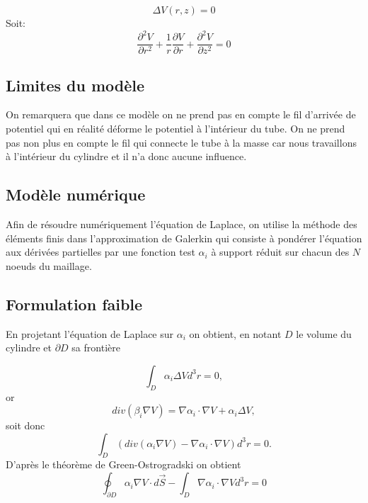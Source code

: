 \documentclass[a4paper,12pt]{article}
\begin{document}
\begin{equation}
\Delta V(r,z)=0
\end{equation}
Soit:
\begin{equation}
\frac{\partial^2 V}{\partial r^2}+\frac{1}{r}\frac{\partial V}{ \partial r}+\frac{\partial^2 V}{\partial z^2}=0
\end{equation}

\subsection{Limites du modèle}
On remarquera que dans ce modèle on ne prend pas en compte le fil d'arrivée de potentiel qui en réalité déforme le potentiel à l'intérieur du tube. On ne prend pas non plus en compte le fil qui connecte le tube à la masse car nous travaillons à l'intérieur du cylindre et il n'a donc aucune influence.

\subsection{Modèle numérique}
Afin de résoudre numériquement l'équation de Laplace, on utilise la méthode des éléments finis dans l'approximation de Galerkin qui consiste à pondérer l'équation aux dérivées partielles par une fonction test $\alpha_i$ à support réduit sur chacun des $N$ noeuds du maillage.

\subsection{Formulation faible}
En projetant l'équation de Laplace sur $\alpha_i$ on obtient, en notant $D$ le volume du cylindre et $\partial D$ sa frontière

\begin{equation}
\int_{D} \alpha_i \Delta V d^3r = 0,
\end{equation}
or
\begin{equation}
div(\beta_i \nabla V) = \nabla \alpha_i \cdot \nabla V + \alpha_i \Delta V,
\end{equation}
soit donc
\begin{equation}
\int_{D} \left( div(\alpha_i \nabla V) - \nabla\alpha_i \cdot \nabla V \right) d^3r = 0.
\end{equation}
D'après le théorème de Green-Ostrogradski on obtient
\begin{equation}
\oint_{\partial D} \alpha_i \nabla V \cdot d\vec{S} - \int_{D} \nabla \alpha_i \cdot \nabla V d^3 r = 0
\end{equation}
\end{document}
